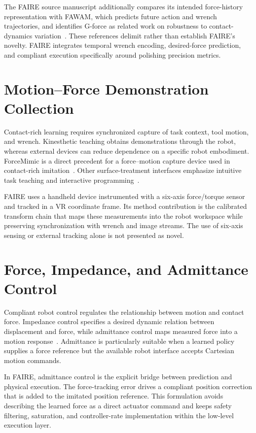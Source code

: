 The FAIRE source manuscript additionally compares its intended force-history representation with FAWAM, which predicts future action and wrench trajectories, and identifies G-force as related work on robustness to contact-dynamics variation~\cite{he2026fawam,TODO_GForce}. These references delimit rather than establish FAIRE's novelty. FAIRE integrates temporal wrench encoding, desired-force prediction, and compliant execution specifically around polishing precision metrics.

\section{Motion--Force Demonstration Collection}
Contact-rich learning requires synchronized capture of task context, tool motion, and wrench. Kinesthetic teaching obtains demonstrations through the robot, whereas external devices can reduce dependence on a specific robot embodiment. ForceMimic is a direct precedent for a force--motion capture device used in contact-rich imitation~\cite{liu2025forcemimic}. Other surface-treatment interfaces emphasize intuitive task teaching and interactive programming~\cite{alt2024robogrind}.

FAIRE uses a handheld device instrumented with a six-axis force/torque sensor and tracked in a VR coordinate frame. Its method contribution is the calibrated transform chain that maps these measurements into the robot workspace while preserving synchronization with wrench and image streams. The use of six-axis sensing or external tracking alone is not presented as novel.

\section{Force, Impedance, and Admittance Control}
Compliant robot control regulates the relationship between motion and contact force. Impedance control specifies a desired dynamic relation between displacement and force, while admittance control maps measured force into a motion response~\cite{hogan1985impedance,villani2008forcecontrol,keemink2018admittance}. Admittance is particularly suitable when a learned policy supplies a force reference but the available robot interface accepts Cartesian motion commands.

In FAIRE, admittance control is the explicit bridge between prediction and physical execution. The force-tracking error drives a compliant position correction that is added to the imitated position reference. This formulation avoids describing the learned force as a direct actuator command and keeps safety filtering, saturation, and controller-rate implementation within the low-level execution layer.

